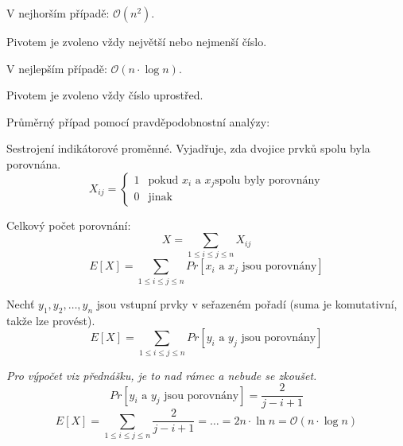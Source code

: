\begin{compactitem}
    \item V nejhorším případě: $\mathcal{O}(n^2)$. \begin{compactitem}
        \item Pivotem je zvoleno vždy největší nebo nejmenší číslo.
    \end{compactitem}

    \item V nejlepším případě: $\mathcal{O}(n \cdot \log{n})$. \begin{compactitem}
        \item Pivotem je zvoleno vždy číslo uprostřed.
    \end{compactitem}

    \item Průměrný případ pomocí pravděpodobnostní analýzy: \begin{compactitem}
        \item Sestrojení indikátorové proměnné. Vyjadřuje, zda dvojice prvků spolu byla porovnána.
        $$ X_{ij} = \left\{
            \begin{array}{ll}
                1 & \text{pokud } x_i \text{ a } x_j \text{spolu byly porovnány} \\
                0 & \text{jinak}
            \end{array}
            \right. $$

        \item Celkový počet porovnání:
        $$ X = \sum_{1 \leq i \leq j \leq n} X_{ij} $$
        $$ E[X] = \sum_{1 \leq i \leq j \leq n} Pr[x_i \text{ a } x_j \text{ jsou porovnány}] $$

        \item Nechť $y_1, y_2, \dots, y_n$ jsou vstupní prvky v seřazeném pořadí (suma je komutativní, takže lze provést).
        $$ E[X] = \sum_{1 \leq i \leq j \leq n} Pr[y_i \text{ a } y_j \text{ jsou porovnány}] $$

        \item \textit{Pro výpočet viz přednášku, je to nad rámec a nebude se zkoušet.}
        $$ Pr[y_i \text{ a } y_j \text{ jsou porovnány}] = \frac{2}{j - i + 1} $$
        $$ E[X] = \sum_{1 \leq i \leq j \leq n} \frac{2}{j - i + 1} = \ldots = 2n \cdot \ln{n} = \mathcal{O}(n \cdot \log{n})$$

    \end{compactitem}
\end{compactitem}


